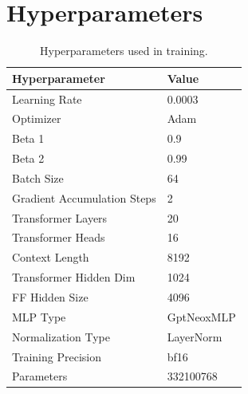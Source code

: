 \documentclass{article}
\theoremstyle{plain}
\theoremstyle{definition}
\theoremstyle{remark}
\begin{document}
\section{Hyperparameters}\label{appendix:hyper-parameters}
\begin{table}[H]
\centering
\begin{tabular}{@{}ll@{}}
\toprule
\textbf{Hyperparameter}       & \textbf{Value}     \\ \midrule
Learning Rate                 & 0.0003             \\
Optimizer                     & Adam               \\
Beta 1                        & 0.9                \\
Beta 2                        & 0.99               \\
Batch Size                    & 64                 \\
Gradient Accumulation Steps   & 2                  \\
Transformer Layers            & 20                 \\
Transformer Heads             & 16                 \\
Context Length                & 8192               \\
Transformer Hidden Dim        & 1024               \\
FF Hidden Size                & 4096               \\
MLP Type                      & GptNeoxMLP         \\
Normalization Type            & LayerNorm          \\
Training Precision            & bf16               \\
Parameters                    & 332100768          \\ \bottomrule
\end{tabular}
\caption{Hyperparameters used in training.}
\end{table}
\newpage
\end{document}
